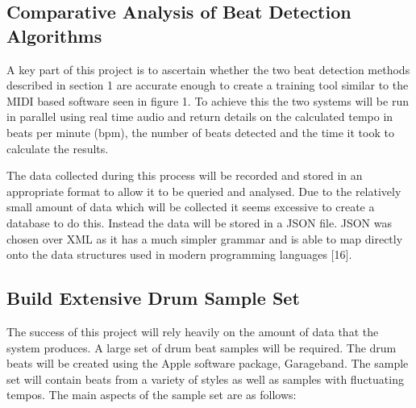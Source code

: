 \documentclass[a4paper, 11pt]{article}
\begin{document}
\subsection{Comparative Analysis of Beat Detection Algorithms}
A key part of this project is to ascertain whether the two beat detection methods described in section 1 are accurate enough to create a training tool similar to the MIDI based software seen in figure 1. To achieve this the two systems will be run in parallel using real time audio and return details on the calculated tempo in beats per minute (bpm), the number of beats detected and the time it took to calculate the results. 

The data collected during this process will be recorded and stored in an appropriate format to allow it to be queried and analysed. Due to the relatively small amount of data which will be collected it seems excessive to create a database to do this. Instead the data will be stored in a JSON file. JSON was chosen over XML as it has a much simpler grammar and is able to map directly onto the data structures used in modern programming languages [16].

\subsection{Build Extensive Drum Sample Set}
The success of this project will rely heavily on the amount of data that the system produces. A large set of drum beat samples will be required. The drum beats will be created using the Apple software package, Garageband. The sample set will contain beats from a variety of styles as well as samples with fluctuating tempos. The main aspects of the sample set are as follows:
\end{document}
